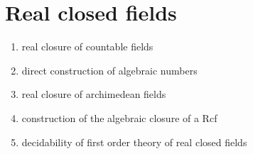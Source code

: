 \chapter{Real closed fields}

\begin{enumerate}
\item real closure of countable fields
\item direct construction of algebraic numbers
\item real closure of archimedean fields
\item construction of the algebraic closure of a Rcf
\item decidability of first order theory of real closed fields
\end{enumerate}


